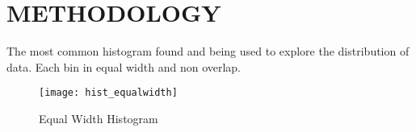 \addblankpage %

\chapter{\textbf{METHODOLOGY}}\label{Introchap} 

%
%
%
%
%
%
%



The most common histogram found and being used to explore the distribution of data. Each bin in equal width and non overlap.

\begin{figure}[h]
	\caption{Equal Width Histogram}
	\centering \texttt{[image: hist\_equalwidth]}
\end{figure}

